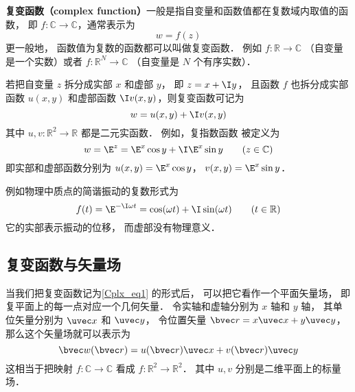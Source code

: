 
\begin{issues}
\issueTODO
\end{issues}

\textbf{复变函数（complex function）}一般是指自变量和函数值都在复数域内取值的函数， 即 $f:\mathbb C \to \mathbb C$，通常表示为
\begin{equation}
w = f(z)
\end{equation}
更一般地， 函数值为复数的函数都可以叫做复变函数． 例如 $f: \mathbb R \to \mathbb C$ （自变量是一个实数）或者 $f:\mathbb R^N \to \mathbb C$ （自变量是 $N$ 个有序实数）．

若把自变量 $z$ 拆分成实部 $x$ 和虚部 $y$， 即 $z = x + \I y$， 且函数 $f$ 也拆分成实部函数 $u(x,y)$ 和虚部函数 $\I v(x,y)$，则复变函数可记为
\begin{equation}\label{Cplx_eq1}
w = u(x,y) + \I v(x,y)
\end{equation}
其中 $u, v: \mathbb R^2 \to \mathbb R$ 都是二元实函数． 例如，复指数函数 被定义为
\begin{equation}\label{Cplx_eq3}
w = \E^z = \E^x \cos y + \I \E^x\sin y \qquad (z \in \mathbb C)
\end{equation}
即实部和虚部函数分别为 $u(x, y) = \E^x \cos y$， $v(x, y) = \E^x \sin y$．

例如物理中质点的简谐振动的复数形式为
\begin{equation}
f(t) = \E^{-\I \omega t} = \cos(\omega t) + \I \sin(\omega t) \qquad (t \in \mathbb R)
\end{equation}
它的实部表示振动的位移， 而虚部没有物理意义．

\subsection{复变函数与矢量场}
当我们把复变函数记为\autoref{Cplx_eq1} 的形式后， 可以把它看作一个平面矢量场， 即复平面上的每一点对应一个几何矢量． 令实轴和虚轴分别为 $x$ 轴和 $y$ 轴， 其单位矢量分别为 $\uvec x$ 和 $\uvec y$， 令位置矢量 $\bvec r = x \uvec x + y \uvec y$， 那么这个矢量场就可以表示为
\begin{equation}\label{Cplx_eq4}
\bvec w(\bvec r) = u(\bvec r) \uvec x + v(\bvec r) \uvec y
\end{equation}
这相当于把映射 $f:\mathbb C \to \mathbb C$ 看成 $f: \mathbb R^2 \to \mathbb R^2$． 其中 $u, v$ 分别是二维平面上的标量场．

